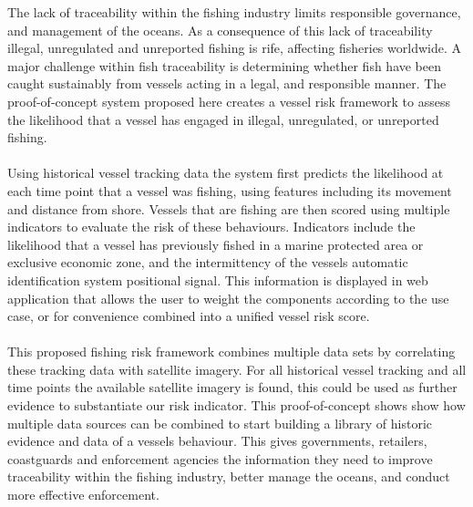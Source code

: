 \doublespacing
\noindent The lack of traceability within the fishing industry limits responsible governance, and management of the oceans. As a consequence of this lack of traceability illegal, unregulated and unreported fishing is rife, affecting fisheries worldwide. A major challenge within fish traceability is determining whether fish have been caught sustainably from vessels acting in a legal, and responsible manner. The proof-of-concept system proposed here creates a vessel risk framework to assess the likelihood that a vessel has engaged in illegal, unregulated, or unreported fishing.\\~\\
\noindent Using historical vessel tracking data the system first predicts the likelihood at each time point that a vessel was fishing, using features including its movement and distance from shore. Vessels that are fishing are then scored using multiple indicators to evaluate the risk of these behaviours. Indicators include the likelihood that a vessel has previously fished in a marine protected area or exclusive economic zone, and the intermittency of the vessels automatic identification system positional signal. This information is displayed in web application that allows the user to weight the components according to the use case, or for convenience combined into a unified vessel risk score.\\~\\
\noindent This proposed fishing risk framework combines multiple data sets by correlating these tracking data with satellite imagery. For all historical vessel tracking and all time points the available satellite imagery is found, this could be used as further evidence to substantiate our risk indicator. This proof-of-concept shows show how multiple data sources can be combined to start building a library of historic evidence and data of a vessels behaviour. This gives governments, retailers, coastguards and enforcement agencies the information they need to improve traceability within the fishing industry, better manage the oceans, and conduct more effective enforcement.
